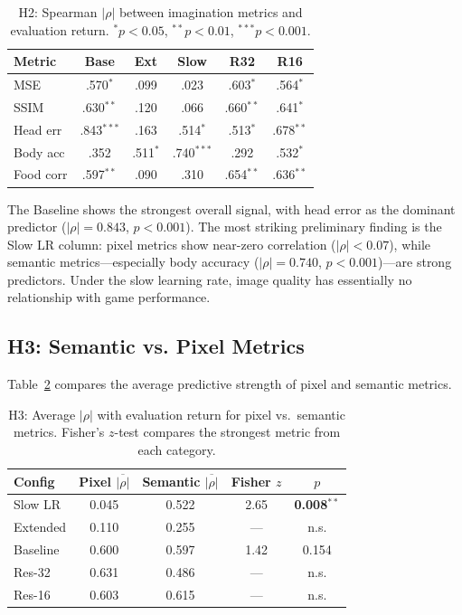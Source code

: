 \documentclass[letterpaper]{article}
\begin{document}
\begin{table}[h]
\centering
\small
\begin{tabular}{lccccc}
\toprule
\textbf{Metric} & \textbf{Base} & \textbf{Ext} & \textbf{Slow} & \textbf{R32} & \textbf{R16} \\
\midrule
MSE              & .570$^{*}$  & .099 & .023 & .603$^{*}$  & .564$^{*}$  \\
SSIM             & .630$^{**}$ & .120 & .066 & .660$^{**}$ & .641$^{*}$  \\
Head err         & .843$^{***}$& .163 & .514$^{*}$  & .513$^{*}$  & .678$^{**}$ \\
Body acc         & .352        & .511$^{*}$  & .740$^{***}$& .292 & .532$^{*}$  \\
Food corr        & .597$^{**}$ & .090 & .310 & .654$^{**}$ & .636$^{**}$ \\
\bottomrule
\end{tabular}
\caption{H2: Spearman $|\rho|$ between imagination metrics and evaluation return. $^{*}p < 0.05$, $^{**}p < 0.01$, $^{***}p < 0.001$.}
\label{tab:h2}
\end{table}

The Baseline shows the strongest overall signal, with head error as the dominant predictor ($|\rho| = 0.843$, $p < 0.001$). The most striking preliminary finding is the Slow LR column: pixel metrics show near-zero correlation ($|\rho| < 0.07$), while semantic metrics---especially body accuracy ($|\rho| = 0.740$, $p < 0.001$)---are strong predictors. Under the slow learning rate, image quality has essentially no relationship with game performance.

\subsection{H3: Semantic vs. Pixel Metrics}

Table~\ref{tab:h3} compares the average predictive strength of pixel and semantic metrics.

\begin{table}[h]
\centering
\small
\begin{tabular}{lcccc}
\toprule
\textbf{Config} & \textbf{Pixel} $\overline{|\rho|}$ & \textbf{Semantic} $\overline{|\rho|}$ & \textbf{Fisher $z$} & \textbf{$p$} \\
\midrule
Slow LR     & 0.045 & 0.522 & 2.65 & \textbf{0.008}$^{**}$ \\
Extended    & 0.110 & 0.255 & ---  & n.s. \\
Baseline    & 0.600 & 0.597 & 1.42 & 0.154 \\
Res-32      & 0.631 & 0.486 & ---  & n.s. \\
Res-16      & 0.603 & 0.615 & ---  & n.s. \\
\bottomrule
\end{tabular}
\caption{H3: Average $|\rho|$ with evaluation return for pixel vs.\ semantic metrics. Fisher's $z$-test compares the strongest metric from each category.}
\label{tab:h3}
\end{table}
\end{document}
